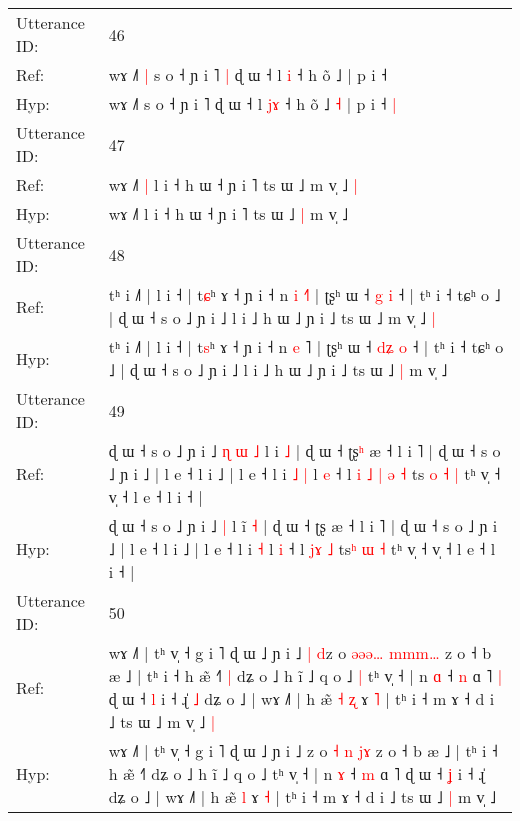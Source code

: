 \documentclass[10pt]{article}
\DeclareRobustCommand{\hl}[1]{{\textcolor{red}{#1}}}
\begin{document}
\begin{longtable}{ll}
 \\
\midrule
Utterance ID: & 46 \\
Ref: & wɤ ˩˥\hl{ }\hl{|} s o ˧ ɲ i ˥\hl{ }\hl{|} ɖ ɯ ˧ l \hl{}\hl{i} ˧ h õ ˩\hl{}\hl{} | p i ˧\hl{}\hl{}
 \\
Hyp: & wɤ ˩˥\hl{}\hl{} s o ˧ ɲ i ˥\hl{}\hl{} ɖ ɯ ˧ l \hl{j}\hl{ɤ} ˧ h õ ˩\hl{ }\hl{˧} | p i ˧\hl{ }\hl{|}
 \\
\midrule
Utterance ID: & 47 \\
Ref: & wɤ ˩˥\hl{ }\hl{|} l i ˧ h ɯ ˧ ɲ i ˥ ts ɯ ˩\hl{}\hl{} m v̩ ˩\hl{ }\hl{|}
 \\
Hyp: & wɤ ˩˥\hl{}\hl{} l i ˧ h ɯ ˧ ɲ i ˥ ts ɯ ˩\hl{ }\hl{|} m v̩ ˩\hl{}\hl{}
 \\
\midrule
Utterance ID: & 48 \\
Ref: & tʰ i ˩˥ | l i ˧ | t\hl{ɕ}ʰ ɤ ˧ ɲ i ˧ n \hl{i} \hl{˧}˥ | ʈʂʰ ɯ ˧ \hl{}\hl{g} \hl{i} ˧ | tʰ i ˧ tɕʰ o ˩ | ɖ ɯ ˧ s o ˩ ɲ i ˩ l i ˩ h ɯ ˩ ɲ i ˩ ts ɯ ˩\hl{}\hl{} m v̩ ˩\hl{ }\hl{|}
 \\
Hyp: & tʰ i ˩˥ | l i ˧ | t\hl{s}ʰ ɤ ˧ ɲ i ˧ n \hl{e} \hl{}˥ | ʈʂʰ ɯ ˧ \hl{d}\hl{ʑ} \hl{o} ˧ | tʰ i ˧ tɕʰ o ˩ | ɖ ɯ ˧ s o ˩ ɲ i ˩ l i ˩ h ɯ ˩ ɲ i ˩ ts ɯ ˩\hl{ }\hl{|} m v̩ ˩\hl{}\hl{}
 \\
\midrule
Utterance ID: & 49 \\
Ref: & ɖ ɯ ˧ s o ˩ ɲ i ˩\hl{ }\hl{ɳ}\hl{ }\hl{ɯ} \hl{˩} l i\hl{} \hl{˩} | ɖ ɯ ˧ ʈʂ\hl{ʰ} æ ˧ l i ˥ | ɖ ɯ ˧ s o ˩ ɲ i ˩ | l e ˧ l i ˩ | l e ˧ l i\hl{ }\hl{˩} \hl{|} l \hl{e} ˧ l\hl{ }\hl{i}\hl{ }\hl{˩} \hl{|}\hl{ }\hl{ə} \hl{˧} ts\hl{ }\hl{o} \hl{˧} \hl{|} tʰ v̩ ˧ v̩ ˧ l e ˧ l i ˧ |
 \\
Hyp: & ɖ ɯ ˧ s o ˩ ɲ i ˩\hl{}\hl{}\hl{}\hl{} \hl{|} l i\hl{̃} \hl{˧} | ɖ ɯ ˧ ʈʂ\hl{} æ ˧ l i ˥ | ɖ ɯ ˧ s o ˩ ɲ i ˩ | l e ˧ l i ˩ | l e ˧ l i\hl{}\hl{} \hl{˧} l \hl{i} ˧ l\hl{}\hl{}\hl{}\hl{} \hl{}\hl{j}\hl{ɤ} \hl{˩} ts\hl{}\hl{ʰ} \hl{ɯ} \hl{˧} tʰ v̩ ˧ v̩ ˧ l e ˧ l i ˧ |
 \\
\midrule
Utterance ID: & 50 \\
Ref: & wɤ ˩˥ | tʰ v̩ ˧ g i ˥ ɖ ɯ ˩ ɲ i ˩\hl{ }\hl{|} \hl{d}z o \hl{ə}\hl{ə}\hl{ə}\hl{…} \hl{m}\hl{m}\hl{m}\hl{…} z o ˧ b æ ˩ | tʰ i ˧ h æ̃ ˧˥\hl{ }\hl{|} dʑ o ˩ h ĩ ˩ q o ˩\hl{ }\hl{|} tʰ v̩ ˧ | n \hl{ɑ} ˧ \hl{n} ɑ ˥\hl{ }\hl{|} ɖ ɯ ˧ \hl{l} i ˧ ɻ̍\hl{ }\hl{˩} dʑ o ˩ | wɤ ˩˥ | h æ̃\hl{ }\hl{˧} \hl{ʐ} ɤ \hl{˥} | tʰ i ˧ m ɤ ˧ d i ˩ ts ɯ ˩\hl{}\hl{} m v̩ ˩\hl{ }\hl{|}
 \\
Hyp: & wɤ ˩˥ | tʰ v̩ ˧ g i ˥ ɖ ɯ ˩ ɲ i ˩\hl{}\hl{} \hl{}z o \hl{}\hl{}\hl{}\hl{˧} \hl{n}\hl{ }\hl{j}\hl{ɤ} z o ˧ b æ ˩ | tʰ i ˧ h æ̃ ˧˥\hl{}\hl{} dʑ o ˩ h ĩ ˩ q o ˩\hl{}\hl{} tʰ v̩ ˧ | n \hl{ɤ} ˧ \hl{m} ɑ ˥\hl{}\hl{} ɖ ɯ ˧ \hl{ʝ} i ˧ ɻ̍\hl{}\hl{} dʑ o ˩ | wɤ ˩˥ | h æ̃\hl{}\hl{} \hl{l} ɤ \hl{˧} | tʰ i ˧ m ɤ ˧ d i ˩ ts ɯ ˩\hl{ }\hl{|} m v̩ ˩\hl{}\hl{}

\end{longtable}
\end{document}
